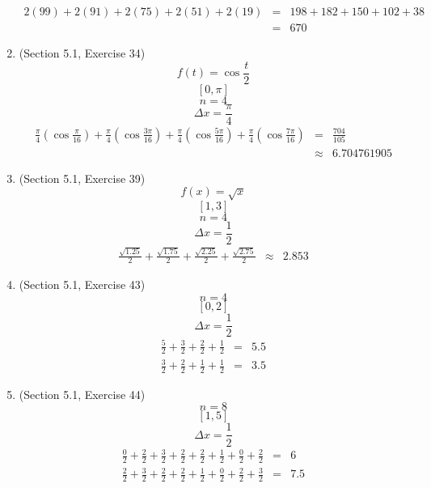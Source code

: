 \documentclass{article}
\begin{document}
\begin{enumerate}
\begin{eqnarray}
            2\left(99\right) + 2\left(91\right) + 2\left(75\right) + 2\left(51\right) + 2\left(19\right) &=& 198 + 182 + 150 + 102 + 38 \\
                                                                                                         &=& 670
        \end{eqnarray}
    \item (Section 5.1, Exercise 34)
        $$f(t) = \cos{\frac{t}{2}}$$
        $$[0, \pi]$$
        $$n = 4$$
        $$\Delta{x} = \frac{\pi}{4}$$
        \begin{eqnarray}
            \frac{\pi}{4}\left(\cos{\frac{\pi}{16}}\right) + \frac{\pi}{4}\left(\cos{\frac{3\pi}{16}}\right) + \frac{\pi}{4}\left(\cos{\frac{5\pi}{16}}\right) + \frac{\pi}{4}\left(\cos{\frac{7\pi}{16}}\right) &=& \frac{704}{105} \\
                                                                                                                                                                                                                 &\approx& 6.704761905
        \end{eqnarray}
    \item (Section 5.1, Exercise 39)
        $$f(x) = \sqrt{x}$$
        $$[1,3]$$
        $$n = 4$$
        $$\Delta{x} = \frac{1}{2}$$
        \begin{eqnarray}
            \frac{\sqrt{1.25}}{2} + \frac{\sqrt{1.75}}{2} + \frac{\sqrt{2.25}}{2} + \frac{\sqrt{2.75}}{2} &\approx& 2.853
        \end{eqnarray}
    \item (Section 5.1, Exercise 43)
        $$n = 4$$
        $$[0,2]$$
        $$\Delta{x} = \frac{1}{2}$$
        \begin{eqnarray}
            \frac{5}{2} + \frac{3}{2} + \frac{2}{2} + \frac{1}{2} &=& 5.5 \\
            \frac{3}{2} + \frac{2}{2} + \frac{1}{2} + \frac{1}{2} &=& 3.5
        \end{eqnarray}
    \item (Section 5.1, Exercise 44)
        $$n = 8$$
        $$[1,5]$$
        $$\Delta{x} = \frac{1}{2}$$
        \begin{eqnarray}
            \frac{0}{2} + \frac{2}{2} + \frac{3}{2} + \frac{2}{2} + \frac{2}{2} + \frac{1}{2} + \frac{0}{2} + \frac{2}{2} &=& 6 \\
            \frac{2}{2} + \frac{3}{2} + \frac{2}{2} + \frac{2}{2} + \frac{1}{2} + \frac{0}{2} + \frac{2}{2} + \frac{3}{2} &=& 7.5
        \end{eqnarray}

\end{enumerate}
\end{document}
